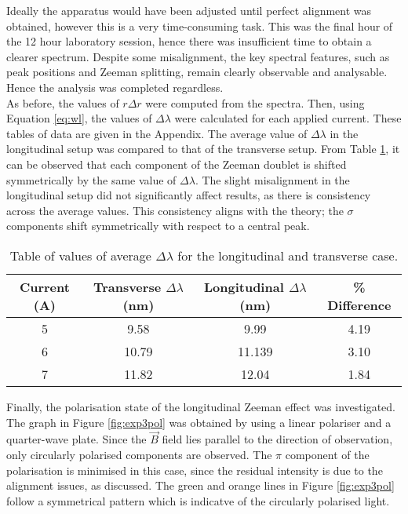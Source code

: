 \documentclass[11pt,twocolumn, a4paper]{article}
\numberwithin{equation}{section} %
\numberwithin{figure}{section} %
\numberwithin{table}{section} %
\begin{document}
Ideally the apparatus would have been adjusted until perfect alignment was obtained, however this is a very time-consuming task. This was the final hour of the 12 hour laboratory session, hence there was insufficient time to obtain a clearer spectrum. Despite some misalignment, the key spectral features, such as peak positions and Zeeman splitting, remain clearly observable and analysable.  Hence the analysis was completed regardless. \\

As before, the values of \(r \Delta r\) were computed from the spectra. Then, using Equation \ref{eq:wl}, the values of \(\Delta \lambda\) were calculated for each applied current. These tables of data are given in the Appendix.  The average value of \(\Delta \lambda\) in the longitudinal  setup was compared to that of the transverse setup. From Table \ref{tab:delta_lambda_comparison}, it can be observed that each component of the Zeeman doublet is shifted symmetrically by the same value of \(\Delta \lambda\). The slight misalignment in the longitudinal setup did not significantly affect results, as there is consistency across the average values. This consistency aligns with the theory; the \(\sigma\) components shift symmetrically with respect to a central peak. 

\begin{table}[H]
\centering
\caption{Table of values of average $\Delta \lambda$ for the longitudinal and transverse case.}
\begin{tabular}{|c|c|c|c|}
\hline
\textbf{Current (A)} & \textbf{Transverse $\Delta \lambda$ (nm)} & \textbf{Longitudinal $\Delta \lambda$ (nm)} & \textbf{\% Difference} \\
\hline
5 & 9.58 & 9.99 & 4.19 \\
6 & 10.79 & 11.139 & 3.10 \\
7 & 11.82 & 12.04 & 1.84 \\
\hline
\end{tabular}
\label{tab:delta_lambda_comparison}
\end{table}

Finally, the polarisation state of the longitudinal Zeeman effect was investigated. The graph in Figure \ref{fig:exp3pol} was obtained by using a linear polariser and a quarter-wave plate. Since the $\vec{B}$ field lies parallel to the direction of observation, only circularly polarised components are observed. The \(\pi\) component of the polarisation is minimised in this case, since the residual intensity is due to the alignment issues, as discussed. The green and orange lines in Figure \ref{fig:exp3pol} follow a symmetrical pattern which is indicatve of the circularly polarised light. 
\end{document}
